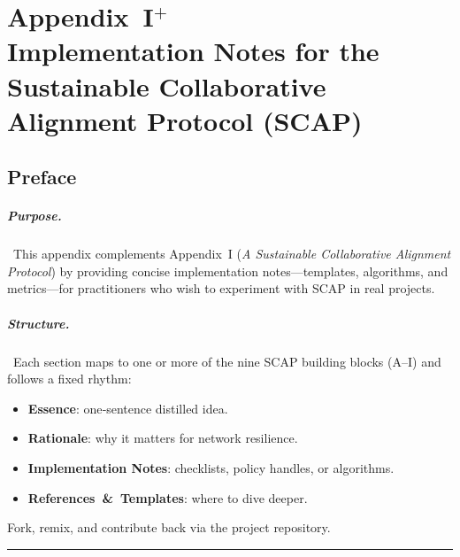 
\chapter{Appendix I$^{+}$\\Implementation Notes for the Sustainable Collaborative Alignment Protocol (SCAP)}\label{appendix:scap}


\section*{Preface}
\paragraph{Purpose.}\ This appendix complements Appendix~I (\emph{A Sustainable Collaborative Alignment Protocol}) by providing concise implementation notes—templates, algorithms, and metrics—for practitioners who wish to experiment with SCAP in real projects.

\paragraph{Structure.}\ Each section maps to one or more of the nine SCAP building blocks (A–I) and follows a fixed rhythm:
\begin{itemize}
  \item \textbf{Essence}: one‑sentence distilled idea.
  \item \textbf{Rationale}: why it matters for network resilience.
  \item \textbf{Implementation Notes}: checklists, policy handles, or algorithms.
  \item \textbf{References \& Templates}: where to dive deeper.
\end{itemize}
Fork, remix, and contribute back via the project repository.

\bigskip\hrule\bigskip

